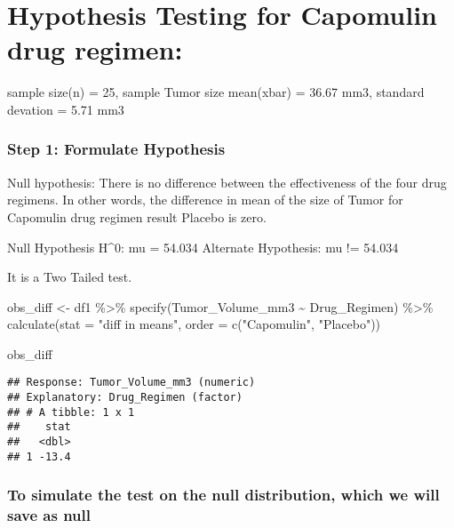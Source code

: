 \documentclass[
]{article}
\newenvironment{Shaded}{\begin{snugshade}}{\end{snugshade}}
\newcommand{\AttributeTok}[1]{\textcolor[rgb]{0.77,0.63,0.00}{#1}}
\newcommand{\FunctionTok}[1]{\textcolor[rgb]{0.00,0.00,0.00}{#1}}
\newcommand{\NormalTok}[1]{#1}
\newcommand{\OtherTok}[1]{\textcolor[rgb]{0.56,0.35,0.01}{#1}}
\newcommand{\SpecialCharTok}[1]{\textcolor[rgb]{0.00,0.00,0.00}{#1}}
\newcommand{\StringTok}[1]{\textcolor[rgb]{0.31,0.60,0.02}{#1}}
\begin{document}
\hypertarget{hypothesis-testing-for-capomulin-drug-regimen}{%
\section{Hypothesis Testing for Capomulin drug
regimen:}\label{hypothesis-testing-for-capomulin-drug-regimen}}

sample size(n) = 25, sample Tumor size mean(xbar) = 36.67 mm3, standard
devation = 5.71 mm3

\hypertarget{step-1-formulate-hypothesis}{%
\subsubsection{Step 1: Formulate
Hypothesis}\label{step-1-formulate-hypothesis}}

Null hypothesis: There is no difference between the effectiveness of the
four drug regimens. In other words, the difference in mean of the size
of Tumor for Capomulin drug regimen result Placebo is zero.

Null Hypothesis H\^{}0: mu = 54.034 Alternate Hypothesis: mu != 54.034

It is a Two Tailed test.

\begin{Shaded}
\begin{Highlighting}[]
\NormalTok{obs\_diff }\OtherTok{\textless{}{-}}\NormalTok{ df1 }\SpecialCharTok{\%\textgreater{}\%}
  \FunctionTok{specify}\NormalTok{(Tumor\_Volume\_mm3 }\SpecialCharTok{\textasciitilde{}}\NormalTok{ Drug\_Regimen) }\SpecialCharTok{\%\textgreater{}\%}
  \FunctionTok{calculate}\NormalTok{(}\AttributeTok{stat =} \StringTok{"diff in means"}\NormalTok{, }\AttributeTok{order =} \FunctionTok{c}\NormalTok{(}\StringTok{"Capomulin"}\NormalTok{, }\StringTok{"Placebo"}\NormalTok{))}

\NormalTok{obs\_diff}
\end{Highlighting}
\end{Shaded}

\begin{verbatim}
## Response: Tumor_Volume_mm3 (numeric)
## Explanatory: Drug_Regimen (factor)
## # A tibble: 1 x 1
##    stat
##   <dbl>
## 1 -13.4
\end{verbatim}

\hypertarget{to-simulate-the-test-on-the-null-distribution-which-we-will-save-as-null}{%
\subsubsection{To simulate the test on the null distribution, which we
will save as
null}\label{to-simulate-the-test-on-the-null-distribution-which-we-will-save-as-null}}
\end{document}
